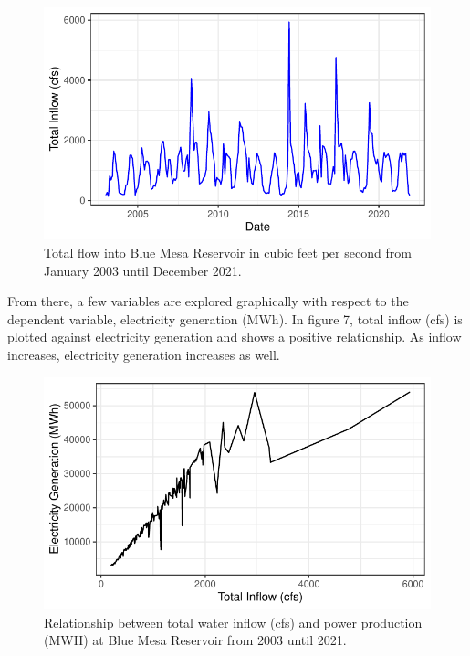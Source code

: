 \documentclass[
  12pt,
]{article}
\begin{document}
\begin{figure}

{\centering \includegraphics{Project_Report_files/figure-latex/total flow-1} 

}

\caption{Total flow into Blue Mesa Reservoir in cubic feet per second from January 2003 until December 2021.}\label{fig:total flow}
\end{figure}

From there, a few variables are explored graphically with respect to the
dependent variable, electricity generation (MWh). In figure 7, total
inflow (cfs) is plotted against electricity generation and shows a
positive relationship. As inflow increases, electricity generation
increases as well.

\begin{figure}

{\centering \includegraphics{Project_Report_files/figure-latex/MWHxTotal-1} 

}

\caption{Relationship between total water inflow (cfs) and power production (MWH) at Blue Mesa Reservoir from 2003 until 2021.}\label{fig:MWHxTotal}
\end{figure}
\end{document}
